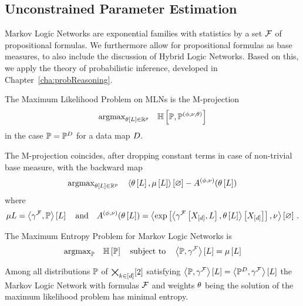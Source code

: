 \subsection{Unconstrained Parameter Estimation} \label{sec:parameterEstimation} %

Markov Logic Networks are exponential families with statistics by a set $\mathcal{F}$ of propositional formulas.
We furthermore allow for propositional formulas as base measures, to also include the discussion of Hybrid Logic Networks.
Based on this, we apply the theory of probabilistic inference, developed in Chapter~\ref{cha:probReasoning}.

The Maximum Likelihood Problem on MLNs is the M-projection
\begin{align*}
	\mathrm{argmax}_{\theta\left[L\right]\in\mathbb{R}^{p}} \quad 
	\mathbb{H}\left[\mathbb{P},\mathbb{P}^{(\phi,\nu,\theta)}\right]	
\end{align*}
in the case $\mathbb{P}=\mathbb{P}^{D}$ for a data map $D$.

The M-projection coincides, after dropping constant terms in case of non-trivial base measure, with the backward map
\begin{align*}
	\mathrm{argmax}_{\theta\left[L\right]\in\mathbb{R}^{p}} \quad 
	\left\langle \theta\left[L\right],\mu\left[L\right]\right\rangle \left[ \varnothing \right] - A^{(\phi,\nu)}(\theta\left[L\right]) 
\end{align*}
where
\begin{align*}
	\mu{L} = \left\langle \gamma^{\mathcal{F}},\mathbb{P}\right\rangle \left[ L \right] 
	\quad \text{and} \quad
	A^{(\phi,\nu)}(\theta\left[L\right]) = \left\langle \mathrm{exp}\left[ \left\langle \gamma^{\mathcal{F}}\left[X_{[d]},L\right],\theta\left[L\right]\right\rangle \left[ X_{[d]} \right] \right], \nu\right\rangle \left[ \varnothing \right] \, . 
\end{align*}

The Maximum Entropy Problem for Markov Logic Networks is
\begin{align}
	\mathrm{argmax}_{\mathbb{P}} \quad \mathbb{H}\left[\mathbb{P}\right] 
	\quad \text{subject to} \quad  
	\left\langle \mathbb{P},\gamma^{\mathcal{F}}\right\rangle \left[ L \right]
	 =  \mu\left[L\right] 
\end{align}


\begin{corollary}
	Among all distributions $\mathbb{P}$ of $\bigtimes_{k\in[d]}[2]$ satisfying $\left\langle \mathbb{P},\gamma^{\mathcal{F}}\right\rangle \left[ L \right]
	 = \left\langle \mathbb{P}^{D},\gamma^{\mathcal{F}}\right\rangle \left[ L \right]$ the Markov Logic Network with formulas $\mathcal{F}$ and weights $\theta$ being the solution of the maximum likelihood problem has minimal entropy.
\end{corollary}

